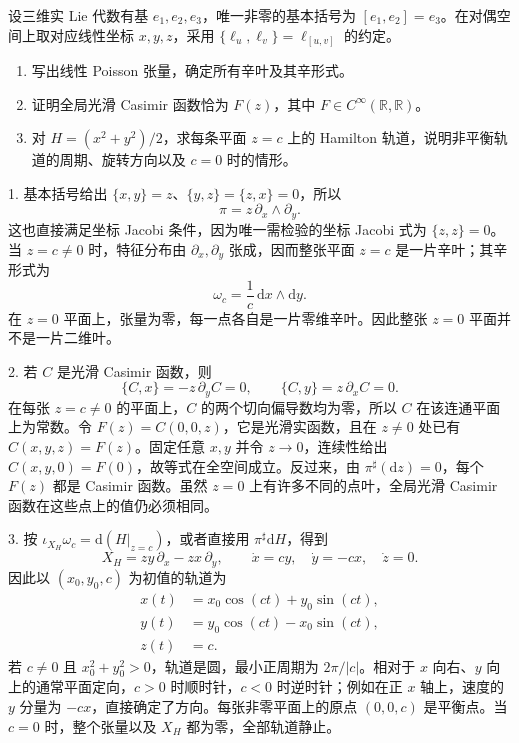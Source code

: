 \begin{optionalexercise}\label{g4:ex:0904:nilpotent-linear}
	设三维实 Lie 代数有基 \(e_1,e_2,e_3\)，唯一非零的基本括号为 \([e_1,e_2]=e_3\)。在对偶空间上取对应线性坐标 \(x,y,z\)，采用 \(\{\ell_u,\ell_v\}=\ell_{[u,v]}\) 的约定。
	\begin{enumerate}
		\item 写出线性 Poisson 张量，确定所有辛叶及其辛形式。
		\item 证明全局光滑 Casimir 函数恰为 \(F(z)\)，其中 \(F\in C^\infty(\mathbb R,\mathbb R)\)。
		\item 对 \(H=(x^2+y^2)/2\)，求每条平面 \(z=c\) 上的 Hamilton 轨道，说明非平衡轨道的周期、旋转方向以及 \(c=0\) 时的情形。
	\end{enumerate}
\end{optionalexercise}
\begin{solution}
	1. 基本括号给出 \(\{x,y\}=z\)、\(\{y,z\}=\{z,x\}=0\)，所以
	\[
		\pi=z\,\partial_x\wedge\partial_y.
	\]
	这也直接满足坐标 Jacobi 条件，因为唯一需检验的坐标 Jacobi 式为 \(\{z,z\}=0\)。当 \(z=c\ne0\) 时，特征分布由 \(\partial_x,\partial_y\) 张成，因而整张平面 \(z=c\) 是一片辛叶；其辛形式为
	\[
		\omega_c=\frac1c\,\mathrm{d}x\wedge\mathrm{d}y.
	\]
	在 \(z=0\) 平面上，张量为零，每一点各自是一片零维辛叶。因此整张 \(z=0\) 平面并不是一片二维叶。

	2. 若 \(C\) 是光滑 Casimir 函数，则
	\[
		\{C,x\}=-z\,\partial_yC=0,\qquad
		\{C,y\}=z\,\partial_xC=0.
	\]
	在每张 \(z=c\ne0\) 的平面上，\(C\) 的两个切向偏导数均为零，所以 \(C\) 在该连通平面上为常数。令 \(F(z)=C(0,0,z)\)，它是光滑实函数，且在 \(z\ne0\) 处已有 \(C(x,y,z)=F(z)\)。固定任意 \(x,y\) 并令 \(z\to0\)，连续性给出 \(C(x,y,0)=F(0)\)，故等式在全空间成立。反过来，由 \(\pi^\sharp(\mathrm{d}z)=0\)，每个 \(F(z)\) 都是 Casimir 函数。虽然 \(z=0\) 上有许多不同的点叶，全局光滑 Casimir 函数在这些点上的值仍必须相同。

	3. 按 \(\iota_{X_H}\omega_c=\mathrm{d}(H|_{z=c})\)，或者直接用 \(\pi^\sharp\mathrm{d}H\)，得到
	\[
		X_H=zy\,\partial_x-zx\,\partial_y,\qquad
		\dot x=cy,\quad \dot y=-cx,\quad \dot z=0.
	\]
	因此以 \((x_0,y_0,c)\) 为初值的轨道为
	\[
		\begin{aligned}
			x(t)&=x_0\cos(ct)+y_0\sin(ct),\\
			y(t)&=y_0\cos(ct)-x_0\sin(ct),\\
			z(t)&=c.
		\end{aligned}
	\]
	若 \(c\ne0\) 且 \(x_0^2+y_0^2>0\)，轨道是圆，最小正周期为 \(2\pi/|c|\)。相对于 \(x\) 向右、\(y\) 向上的通常平面定向，\(c>0\) 时顺时针，\(c<0\) 时逆时针；例如在正 \(x\) 轴上，速度的 \(y\) 分量为 \(-cx\)，直接确定了方向。每张非零平面上的原点 \((0,0,c)\) 是平衡点。当 \(c=0\) 时，整个张量以及 \(X_H\) 都为零，全部轨道静止。
\end{solution}
